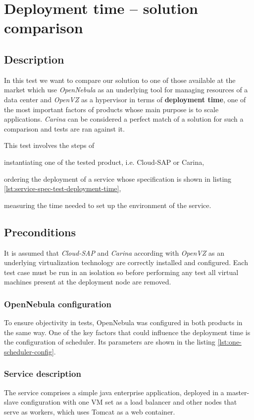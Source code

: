\section{Deployment time -- solution comparison}
\subsection*{Description}
In this test we want to compare our solution to one of those available at the market which use \emph{OpenNebula} as an underlying tool for managing resources of a data center and \emph{OpenVZ} as a hypervisor in terms of \textbf{deployment time}, one of the most important factors of products whose main purpose is to scale applications.
\emph{Carina} \cite{Carina} can be considered a perfect match of a solution for such a comparison and tests are ran against it.

This test involves the steps of
  \begin{inparaenum}[i)]
    \item instantiating one of the tested product, i.e. Cloud-SAP or Carina,
    \item ordering the deployment of a service whose specification is shown in listing \ref{lst:service-spec-test-deployment-time},
    \item measuring the time needed to set up the environment of the service.
  \end{inparaenum}

\subsection*{Preconditions}
It is assumed that \emph{Cloud-SAP} and \emph{Carina} according with \emph{OpenVZ} as an underlying virtualization technology are correctly installed and configured.
Each test case must be run in an isolation so before performing any test all virtual machines present at the deployment node are removed.
\subsubsection{OpenNebula configuration}
To ensure objectivity in tests, OpenNebula was configured in both products in the same way. One of the key factors that could influence the deployment time is the configuration of scheduler. Its parameters are shown in the listing \ref{lst:one-scheduler-config}.

\subsubsection{Service description}
The service comprises a simple java enterprise application, deployed in a master-slave configuration with one VM set as a load balancer and other nodes that serve as workers, which uses Tomcat as a web container.

